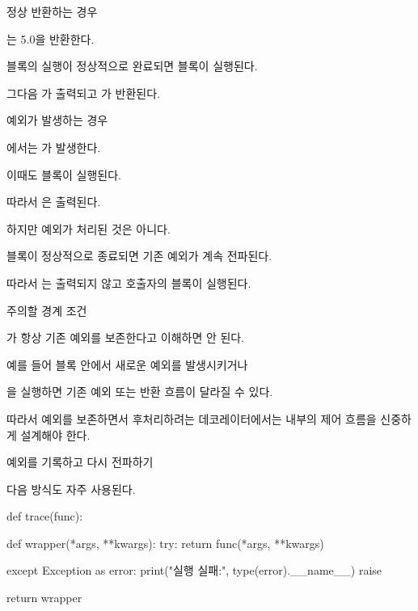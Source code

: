 \begin{dhknote}
\begin{dhksmry}[centered]
정상 반환하는 경우
\end{dhksmry}
\end{dhknote}

는 5.0을 반환한다.

 블록의 실행이 정상적으로 완료되면  블록이 실행된다.

그다음 가 출력되고 가 반환된다.

\begin{dhknote}
\begin{dhksmry}[centered]
예외가 발생하는 경우
\end{dhksmry}
\end{dhknote}

에서는 가 발생한다.

이때도  블록이 실행된다.

따라서 은 출력된다.

하지만 예외가 처리된 것은 아니다.

 블록이 정상적으로 종료되면 기존 예외가 계속 전파된다.

따라서 는 출력되지 않고 호출자의  블록이 실행된다.

\begin{dhknote}
\begin{dhksmry}[centered]
주의할 경계 조건
\end{dhksmry}
\end{dhknote}

가 항상 기존 예외를 보존한다고 이해하면 안 된다.

예를 들어  블록 안에서 새로운 예외를 발생시키거나

을 실행하면 기존 예외 또는 반환 흐름이 달라질 수 있다.

따라서 예외를 보존하면서 후처리하려는 데코레이터에서는  내부의 제어 흐름을 신중하게 설계해야 한다.

\begin{dhknote}
\begin{dhksmry}[centered]
예외를 기록하고 다시 전파하기
\end{dhksmry}
\end{dhknote}

다음 방식도 자주 사용된다.

\begin{dhkcode}
def trace(func):

    def wrapper(*args, **kwargs):
        try:
            return func(*args, **kwargs)

        except Exception as error:
            print("실행 실패:", type(error).__name__)
            raise

    return wrapper
\end{dhkcode}

